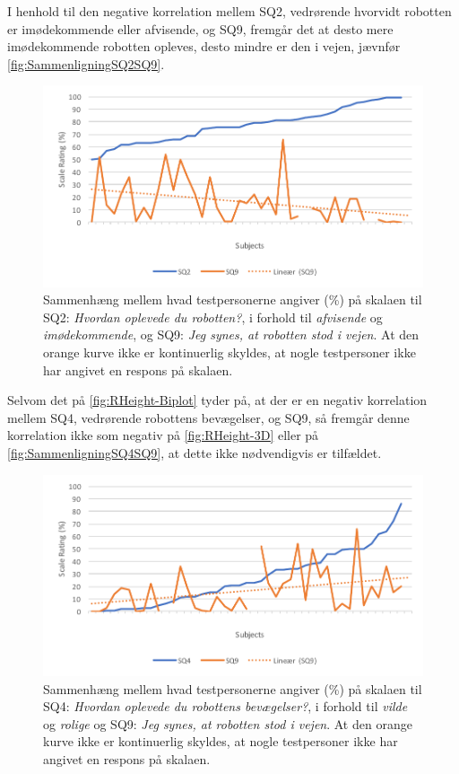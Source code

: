 \noindent
%
I henhold til den negative korrelation mellem SQ2, vedrørende hvorvidt robotten er imødekommende eller afvisende, og SQ9, fremgår det at desto mere imødekommende robotten opleves, desto mindre er den i vejen, jævnfør \autoref{fig:SammenligningSQ2SQ9}.
%
\begin{figure}[H]
	\centering
	\includegraphics[width=\textwidth]{Figure/Korrelationsgrafer/SQ2+SQ9}
	\caption{Sammenhæng mellem hvad testpersonerne angiver (\%) på skalaen til SQ2: \textit{Hvordan oplevede du robotten?}, i forhold til \textit{afvisende} og \textit{imødekommende}, og SQ9: \textit{Jeg synes, at robotten stod i vejen}. At den orange kurve ikke er kontinuerlig skyldes, at nogle testpersoner ikke har angivet en respons på skalaen.}
	\label{fig:SammenligningSQ2SQ9}
\end{figure}
\noindent
%
Selvom det på \autoref{fig:RHeight-Biplot} tyder på, at der er en negativ korrelation mellem SQ4, vedrørende robottens bevægelser, og SQ9, så fremgår denne korrelation ikke som negativ på \autoref{fig:RHeight-3D} eller på \autoref{fig:SammenligningSQ4SQ9}, at dette ikke nødvendigvis er tilfældet.
%
\begin{figure}[H]
	\centering
	\includegraphics[width=\textwidth]{Figure/Korrelationsgrafer/SQ4+SQ9}
	\caption{Sammenhæng mellem hvad testpersonerne angiver (\%) på skalaen til SQ4: \textit{Hvordan oplevede du robottens bevægelser?}, i forhold til \textit{vilde} og \textit{rolige} og SQ9: \textit{Jeg synes, at robotten stod i vejen}. At den orange kurve ikke er kontinuerlig skyldes, at nogle testpersoner ikke har angivet en respons på skalaen.}
	\label{fig:SammenligningSQ4SQ9}
\end{figure}
